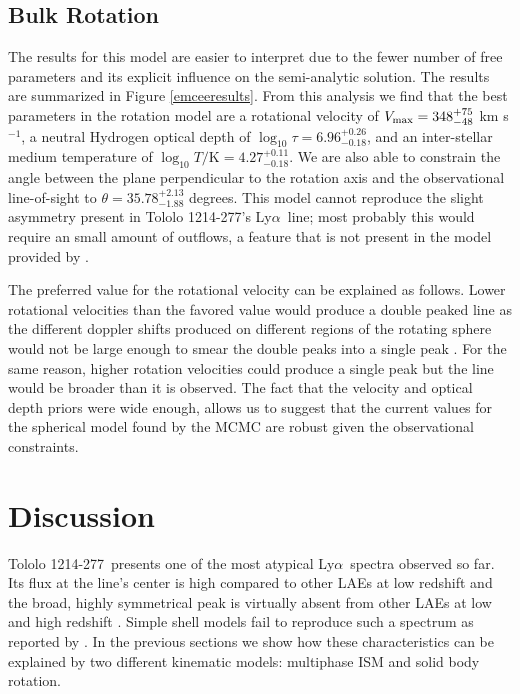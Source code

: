 \documentclass[a4,useAMS,usenatbib,usegraphicx]{mn2e}
\newcommand{\tol}{Tololo 1214-277}
\newcommand{\lya}{\ifmmode{{\rm Ly}\alpha}\else Ly$\alpha$\ \fi}
\newcommand{\kms}{km s$^{-1}$}
\begin{document}
\subsection{Bulk Rotation}

The results for this model are easier to interpret due to the fewer
number of free parameters and its explicit influence on the
semi-analytic solution.
The results are summarized in  Figure \ref{emceeresults}. 
From this analysis we find that the best parameters in the rotation
model are a rotational velocity of  $V_{\rm max}=348^{+75}_{-48}$
\kms, a neutral Hydrogen optical depth of
$\log_{10}\tau=6.96^{+0.26}_{-0.18}$,  and an inter-stellar medium
temperature of $\log_{10} T/\mathrm {K} = 4.27^{+0.11}_{-0.18}$.   
We are also able to constrain the angle between the plane
perpendicular to the rotation axis and the observational line-of-sight
to $\theta = 35.78^{+2.13}_{-1.88}$ degrees.
This model cannot reproduce the slight asymmetry present in \tol's
\lya line; most probably this would require an small amount of
outflows, a feature that is not present in the model provided by
\cite{GaravitoCamargo2014}. 

The preferred value for the rotational velocity can be explained as
follows. 
Lower rotational velocities than the favored value would produce a
double peaked line as the different doppler shifts produced on
different regions of the rotating sphere would not be large enough to
smear the double peaks into a single peak
\citep{GaravitoCamargo2014}. 
For the same reason, higher rotation velocities could produce a single
peak but the line would be broader than it is observed.
The fact that the velocity and optical depth priors were wide enough,
allows us to suggest that the current values for the spherical model
found by the MCMC are robust given the observational constraints.






\section{Discussion}

\tol\ presents one of the most atypical \lya spectra observed so far.
Its flux at the line's center is high compared to other LAEs at low
redshift and the broad, highly symmetrical peak is virtually absent from other
LAEs at low and high redshift
\citep{2012ApJ...751...29Y,LARS,Erb14,Trainor16}. 
Simple shell models
fail to reproduce such a spectrum as reported by \cite{2015A&A...578A...7V}.  
In the previous sections we show how these characteristics can be
explained by two different kinematic models: multiphase ISM and solid
body rotation.
\end{document}
